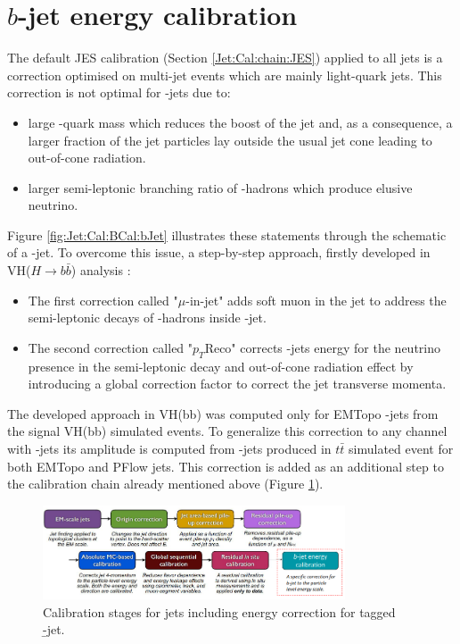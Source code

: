 \section{$b$-jet energy calibration}
\label{Jet:Cal:BCal}
The default JES calibration (Section \ref{Jet:Cal:chain:JES}) applied to all jets is a correction optimised on multi-jet events which are mainly light-quark jets. This correction is not optimal for \bq-jets due to:
\begin{itemize}
    \item large \bq-quark mass which reduces the boost of the jet and, as a consequence, a larger fraction of the jet particles lay outside the usual jet cone leading to out-of-cone radiation.
    \item larger semi-leptonic branching ratio of \bq-hadrons which produce elusive neutrino.
\end{itemize}
Figure \ref{fig:Jet:Cal:BCal:bJet} illustrates these statements through the schematic of a \bq-jet. To overcome this issue, a step-by-step approach, firstly developed in VH($H\rightarrow b\bar{b}$) analysis \cite{Vhbb}: 
\begin{itemize}
    \item The first correction called "$\mu$-in-jet" adds soft muon in the jet to address the semi-leptonic decays of \bq-hadrons inside \bq-jet.
    \item The second correction called "$p_T$Reco" corrects \bq-jets energy for the neutrino presence in the semi-leptonic decay and out-of-cone radiation effect by introducing a global correction factor to correct the jet transverse momenta.
\end{itemize}
 The developed approach in VH(bb) was computed only for EMTopo \bq-jets from the signal VH(bb) simulated events. To generalize this correction to any channel with \bq-jets its amplitude is computed from \bq-jets produced in $t\bar{t}$ simulated event for both EMTopo and PFlow jets. This correction is added as an additional step to the calibration chain already mentioned above (Figure \ref{fig:Jet:Cal:BCal:Chain}).
\begin{figure}[htbp]
    \centering
    \includegraphics[width=0.8\textwidth]{Ch4/Img/b_jet_chain.png}
    \begin{tcolorbox}[colback=black!5!white,colframe=white!75!black]
    \caption{Calibration stages for jets including energy correction for tagged \b-jet.}
    \label{fig:Jet:Cal:BCal:Chain}
    \end{tcolorbox}
\end{figure}
